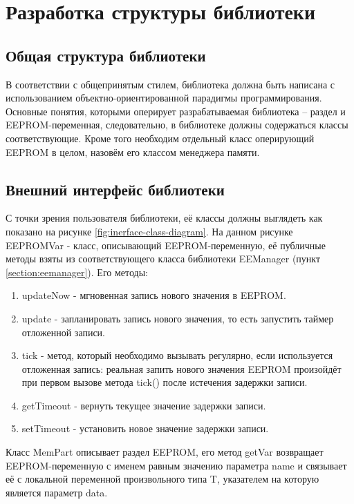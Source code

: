 \section{Разработка структуры библиотеки}

\subsection{Общая структура библиотеки}

В соответствии с общепринятым стилем, библиотека должна быть написана с использованием объектно-ориентированной парадигмы программирования.
Основные понятия, которыми оперирует разрабатываемая библиотека -- раздел и EEPROM-переменная, следовательно, в библиотеке должны содержаться классы соответствующие. Кроме того необходим отдельный класс оперирующий EEPROM в целом, назовём его классом менеджера памяти.


\subsection{Внешний интерфейс библиотеки}

С точки зрения пользователя библиотеки, её классы должны выглядеть как показано на рисунке \ref{fig:inerface-class-diagram}. На данном рисунке EEPROMVar - класс, описывающий EEPROM-переменную, её публичные методы взяты из соответствующего класса библиотеки EEManager (пункт \ref{section:eemanager}). Его методы:
\begin{enumerate}
	\item updateNow - мгновенная запись нового значения в EEPROM.
	\item update - запланировать запись нового значения, то есть запустить таймер отложенной записи.
	\item tick - метод, который необходимо вызывать регулярно, если используется отложенная запись: реальная запить нового значения EEPROM произойдёт при первом вызове метода tick() после истечения задержки записи.
	\item getTimeout - вернуть текущее значение задержки записи.
	\item setTimeout - установить новое значение задержки записи.
\end{enumerate}

Класс MemPart описывает раздел EEPROM, его метод getVar возвращает EEPROM-переменную с именем равным значению параметра name и связывает её с локальной переменной произвольного типа T, указателем на которую является параметр data.


